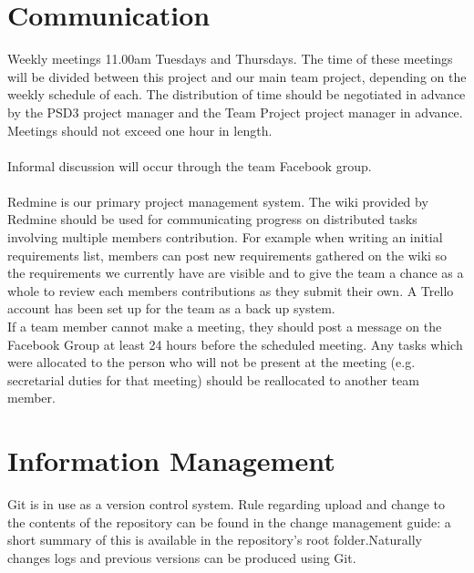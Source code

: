 \documentclass{l3deliverable}
\begin{document}

\section{Communication}

Weekly meetings 11.00am Tuesdays and Thursdays. The time of these meetings will be divided between this project and our main team project, depending on the weekly schedule of each. The distribution of time should be negotiated in advance by the PSD3 project manager and the Team Project project manager in advance. Meetings should not exceed one hour in length.\\
\\
Informal discussion will occur through the team Facebook group.\\
\\
Redmine is our primary project management system. The wiki provided by Redmine should be used for communicating progress on distributed tasks involving multiple members contribution. For example when writing an initial requirements list, members can post new requirements gathered on the wiki so the requirements we currently have are visible and to give the team a chance as a whole to review each members contributions as they submit their own. A Trello account has been set up for the team as a back up system.
\\
If a team member cannot make a meeting, they should post a message on the Facebook Group at least 24 hours before the scheduled meeting. Any tasks which were allocated to the person who will not be present at the meeting (e.g. secretarial duties for that meeting) should be reallocated to another team member.
\\


\section{Information Management}

Git is in use as a version control system. Rule regarding upload and change to the contents of the repository can be found in the change management guide: a short summary of this is available in the repository's root folder.Naturally changes logs and previous versions can be produced using Git.
\\
\end{document}
